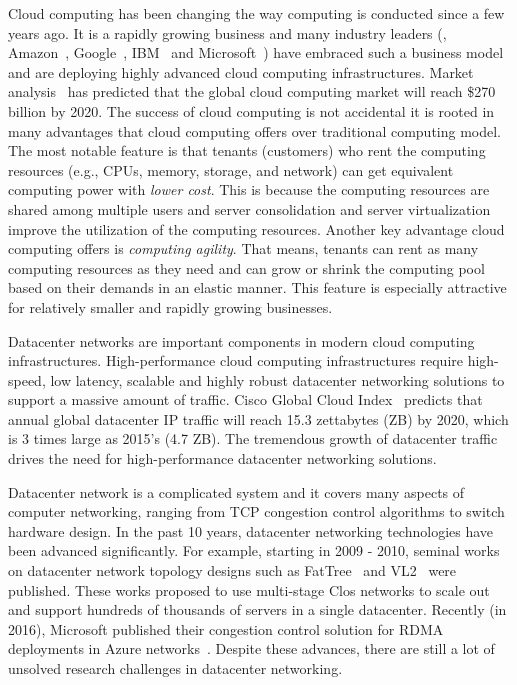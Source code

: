 
Cloud computing has been changing the way computing is conducted since a few years ago.
It is a rapidly growing business and many industry leaders
(\eg{}, Amazon~\cite{amazon-aws}, Google~\cite{google-compute}, 
IBM~\cite{ibm-softlayer,ibm-bluemix} and
Microsoft~\cite{microsoft-azure}) have embraced such a
business model and are deploying highly advanced cloud computing infrastructures.
Market analysis~\cite{cloud-market2020}
has predicted that the global cloud computing market will
reach \$270 billion by 2020. The success of cloud computing is
not accidental \textemdash\xspace it is rooted in many advantages that cloud computing offers
over traditional computing model. The most notable feature is that tenants
(customers) who rent the computing resources (e.g., CPUs, memory, storage, and network) can get equivalent computing power
with \emph{lower cost}. This is because the computing resources are shared among multiple users and
server consolidation and server virtualization improve the utilization
of the computing resources. Another key advantage cloud computing offers
is \emph{computing agility}. That means, tenants can rent as many computing
resources as they need and can grow or shrink the computing pool based on their demands 
in an elastic manner.
This feature is especially attractive for relatively smaller and
rapidly growing businesses.

Datacenter networks are important components in modern cloud computing infrastructures. 
High-performance cloud computing infrastructures require high-speed, low latency, scalable and 
highly robust datacenter networking solutions to support a massive amount of traffic. 
Cisco Global Cloud Index~\cite{cisco-predict} predicts that annual global datacenter IP traffic will 
reach 15.3 zettabytes (ZB) by 2020, which is 3 times large as 2015's (4.7 ZB). 
The tremendous growth of datacenter traffic drives the need for high-performance 
datacenter networking solutions. 

Datacenter network is a complicated system and it covers many 
aspects of computer networking, ranging from TCP congestion control algorithms to switch hardware design. 
In the past 10 years, datacenter networking technologies have been advanced significantly. 
For example, starting in 2009 - 2010, seminal works on datacenter network topology designs such as 
FatTree~\cite{fattree} and VL2~\cite{vl2} were published. 
These works proposed to use multi-stage Clos networks to 
scale out and support hundreds of thousands of servers in a single datacenter. 
Recently (in 2016), Microsoft published their congestion control solution for 
RDMA deployments in Azure networks~\cite{zhu2015congestion}. 
Despite these advances, there are still a lot of unsolved research challenges in datacenter networking.


